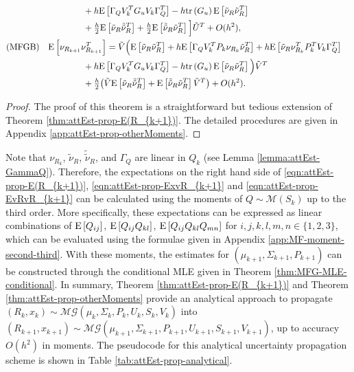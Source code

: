 \begin{theorem}
\begin{subequations}
\begin{flalign}
			&& &\qquad\qquad + h\expect{\Gamma_QV_k^TG_uV_k\Gamma_Q^T} -h\tr{G_u}\expect{\tilde{\nu}_R\tilde{\nu}_R^T} && \nonumber \\
			&& &\qquad\qquad + \tfrac{h}{2}\expect{\tilde{\nu}_R\tilde{\tilde{\nu}}_R^T} + \tfrac{h}{2}\expect{\tilde{\tilde{\nu}}_R\tilde{\nu}_R^T} \Big]\tilde{U}^T + O(h^2), && \label{eqn:attEst-prop-EvRvR_{k+1}-MFGI} \\
			\text{(MFGB)} && &\expect{\nu_{R_{k+1}}\nu_{R_{k+1}}^T} = \tilde{V} \Big( \expect{\tilde{\nu}_R\tilde{\nu}_R^T} + h\expect{\Gamma_QV_k^TP_k\nu_{R_k}\tilde{\nu}_R^T} 
			+ h\expect{\tilde{\nu}_R\nu_{R_k}^TP_k^TV_k\Gamma_Q^T} && \nonumber \\
			&& &\qquad\qquad + h\expect{\Gamma_QV_k^TG_uV_k\Gamma_Q^T} - h\tr{G_u}\expect{\tilde{\nu}_R\tilde{\nu}_R^T} \Big)\tilde{V}^T && \nonumber  \\
			&& &\qquad\qquad + \tfrac{h}{2}\big(\tilde{V}\expect{\tilde{\nu}_R\tilde{\tilde{\nu}}_R^T} 
			+ \expect{\tilde{\tilde{\nu}}_R\tilde{\nu}_R^T}\tilde{V}^T\big) + O(h^2). && \label{eqn:attEst-prop-EvRvR_{k+1}-MFGB}
		\end{flalign}
	\end{subequations}
\end{theorem}
\begin{proof}
	The proof of this theorem is a straightforward but tedious extension of Theorem \ref{thm:attEst-prop-E(R_{k+1})}.
	The detailed procedures are given in Appendix \ref{app:attEst-prop-otherMoments}.
\end{proof}

Note that $\nu_{R_k}$, $\tilde{\nu}_R$, $\tilde{\tilde{\nu}}_R$, and $\Gamma_Q$ are linear in $Q_k$ (see Lemma \ref{lemma:attEst-GammaQ}).
Therefore, the expectations on the right hand side of \eqref{eqn:attEst-prop-E(R_{k+1})}, \eqref{eqn:attEst-prop-ExvR_{k+1}} and \eqref{eqn:attEst-prop-EvRvR_{k+1}} can be calculated using the moments of $Q\sim \mathcal{M}(S_k)$ up to the third order.
More specifically, these expectations can be expressed as linear combinations of $\mathrm{E}\left[ Q_{ij} \right]$, $\mathrm{E}\left[ Q_{ij}Q_{kl} \right]$, $\mathrm{E}\left[ Q_{ij}Q_{kl}Q_{mn} \right]$ for $i,j,k,l,m,n \in \{1,2,3\}$, which can be evaluated using the formulae given in Appendix \ref{app:MF-moment-second-third}.
With these moments, the estimates for $(\mu_{k+1},\Sigma_{k+1},P_{k+1})$ can be constructed through the conditional MLE given in Theorem \ref{thm:MFG-MLE-conditional}. 
In summary, Theorem \ref{thm:attEst-prop-E(R_{k+1})} and Theorem \ref{thm:attEst-prop-otherMoments} provide an analytical approach to propagate $(R_k,x_k)\sim\mathcal{MG}(\mu_k,\allowbreak \Sigma_k,\allowbreak P_k,\allowbreak U_k,\allowbreak S_k,\allowbreak V_k)$ into $(R_{k+1},x_{k+1}) \sim \mathcal{MG}(\mu_{k+1},\allowbreak \Sigma_{k+1},\allowbreak P_{k+1},\allowbreak U_{k+1},\allowbreak S_{k+1},\allowbreak V_{k+1})$, up to accuracy $O(h^2)$ in moments.
The pseudocode for this analytical uncertainty propagation scheme is shown in Table \ref{tab:attEst-prop-analytical}.

